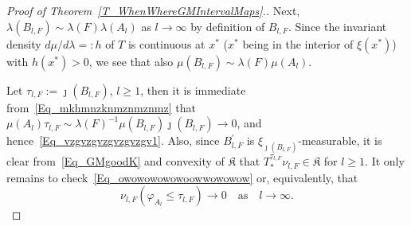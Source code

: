 \documentclass[10pt]{amsart}
\theoremstyle{definition}\newtheorem{defi}[theo]{Definition}\newtheorem{rema}[theo]{Remark}\newtheorem{exam}[theo]{Example}\newtheorem{exem}[theo]{Example}\newtheorem{nota}[theo]{Notation}
\newcommand{\frkK}{\mathfrak{K}}
\begin{document}
\begin{proof}[{Proof of Theorem~\ref{T_WhenWhereGMIntervalMaps}.}]
Next, $\lambda(B_{l,F})\sim\lambda(F)\lambda(A_{l})$ as $l\rightarrow\infty$ by definition of $B_{l,F}$. Since the invariant density $d\mu/d\lambda=:h$ of $T$ is continuous at $x^{\ast}$ ($x^{\ast}$ being in the interior of $\xi(x^{\ast})$) with $h(x^{\ast})>0$, we see that also $\mu(B_{l,F})\sim\lambda(F)\mu(A_{l})$.

Let $\tau_{l,F}:=\jmath(B_{l,F})$, $l\geq1$, then it is immediate from~\eqref{Eq_mkhmnzknmznmznmz} that $\mu(A_{l})\tau_{l,F}\sim\lambda(F)^{-1}
\mu(B_{l,F})\jmath(B_{l,F})\rightarrow0$, and hence~\eqref{Eq_vzgvzgvzgvzgvzgv1}. Also, since $B_{l,F}^{\prime}$ is $\xi _{\jmath(B_{l,F})}$-measura\-ble, it is clear from~\eqref{Eq_GMgoodK} and convexity of $\frkK$ that $T_{\ast}^{\tau_{l,F}}\nu_{l,F}
\in\frkK$ for $l\geq1$. It only remains to check~\eqref{Eq_owowowowowoowwowowow} or, equivalently, that
\begin{equation}\label{Eq_Wuhuhu}
\nu_{l,F}\left(\varphi_{A_{l}}\leq\tau_{l,F}\right) \longrightarrow 0\quad\text{as}\quad l\rightarrow\infty.
\end{equation}



\end{proof}
\end{document}
